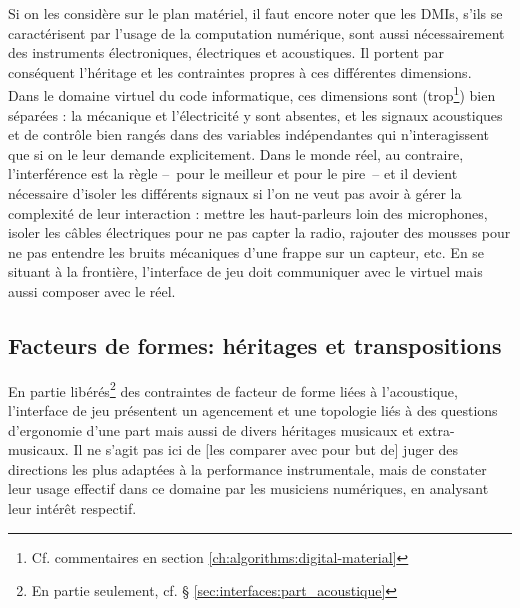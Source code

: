 \noindent Si on les considère sur le plan matériel, il faut encore noter que les \glspl{DMI}, s'ils se caractérisent par l'usage de la computation numérique, sont aussi nécessairement des instruments électroniques, électriques et acoustiques. Il portent par conséquent l'héritage et les contraintes propres à ces différentes dimensions.\\
\indent Dans le domaine virtuel du code informatique, ces dimensions sont (trop\footnote{Cf. commentaires en section \ref{ch:algorithms:digital-material}}) bien séparées : la mécanique et l'électricité y sont absentes, et les signaux acoustiques et de contrôle bien rangés dans des variables indépendantes qui n'interagissent que si on le leur demande explicitement. Dans le monde réel, au contraire, l'interférence est la règle --~pour le meilleur et pour le pire~-- et il devient nécessaire d'isoler les différents signaux si l'on ne veut pas avoir à gérer la complexité de leur interaction : mettre les haut-parleurs loin des microphones, isoler les câbles électriques pour ne pas capter la radio, rajouter des mousses pour ne pas entendre les bruits mécaniques d'une frappe sur un capteur, etc. En se situant à la frontière, l'interface de jeu doit communiquer avec le virtuel mais aussi composer avec le réel.


\subsection{Facteurs de formes: héritages et transpositions}
\label{sec:interfaces:heritages}

\noindent En partie libérés\footnote{En partie seulement, cf. § \ref{sec:interfaces:part_acoustique}} des contraintes de facteur de forme liées à l'acoustique, l'interface de jeu présentent un agencement et une topologie liés à des questions d'ergonomie d'une part mais aussi de divers héritages musicaux et extra-musicaux. Il ne s'agit pas ici de [les comparer avec pour but de] juger des directions les plus adaptées à la performance instrumentale, mais de constater leur usage effectif dans ce domaine par les musiciens numériques, en analysant leur intérêt respectif.

